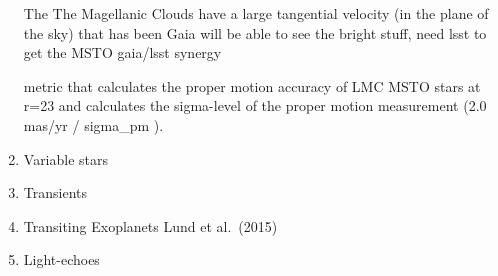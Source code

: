 \begin{enumerate}
The 
The Magellanic Clouds have a large tangential velocity (in the plane of the sky) that has been 
Gaia will be able to see the bright stuff, need lsst to get the MSTO
gaia/lsst synergy

metric that calculates the proper motion accuracy of LMC MSTO stars at r=23 and calculates the sigma-level of
the proper motion measurement (2.0 mas/yr / sigma_pm ).



  
\item Variable stars


  
  
\item Transients
  
\item Transiting Exoplanets
Lund et al.\ (2015)
  

\item Light-echoes
  

\end{enumerate}
